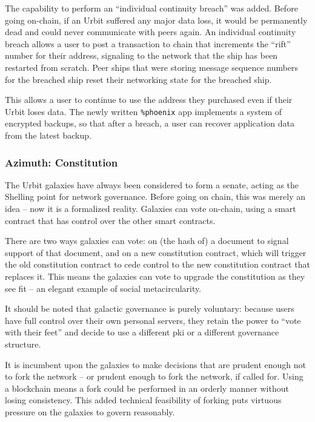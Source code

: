 \documentclass[twoside]{article}
\begin{document}
\sloppy
The capability to perform an ``individual continuity breach'' was added.  Before going on-chain, if an Urbit suffered any major data loss, it would be permanently dead and could never communicate with peers again.  An individual continuity breach allows a user to post a transaction to chain that increments the ``rift'' number for their address, signaling to the network that the ship has been restarted from scratch.  Peer ships that were storing message sequence numbers for the breached ship reset their networking state for the breached ship.

\sloppy
This allows a user to continue to use the address they purchased even if their Urbit loses data.  The newly written \lstinline[style=inlinecode]{%phoenix} app implements a system of encrypted backups, so that after a breach, a user can recover application data from the latest backup.

\subsubsection{Azimuth: Constitution}

\sloppy
The Urbit galaxies have always been considered to form a senate, acting as the Shelling point for network governance.  Before going on chain, this was merely an idea – now it is a formalized reality.  Galaxies can vote on-chain, using a smart contract that has control over the other smart contracts.

There are two ways galaxies can vote: on (the hash of) a document to signal support of that document, and on a new constitution contract, which will trigger the old constitution contract to cede control to the new constitution contract that replaces it.  This means the galaxies can vote to upgrade the constitution as they see fit – an elegant example of social meta\-circularity.

It should be noted that galactic governance is purely voluntary: because users have full control over their own personal servers, they retain the power to ``vote with their feet'' and decide to use a different {\sc pki} or a different governance structure.

It is incumbent upon the galaxies to make decisions that are prudent enough not to fork the network – or prudent enough to fork the network, if called for.  Using a blockchain means a fork could be performed in an orderly manner without losing consistency.  This added technical feasibility of forking puts virtuous pressure on the galaxies to govern reasonably.
\end{document}
